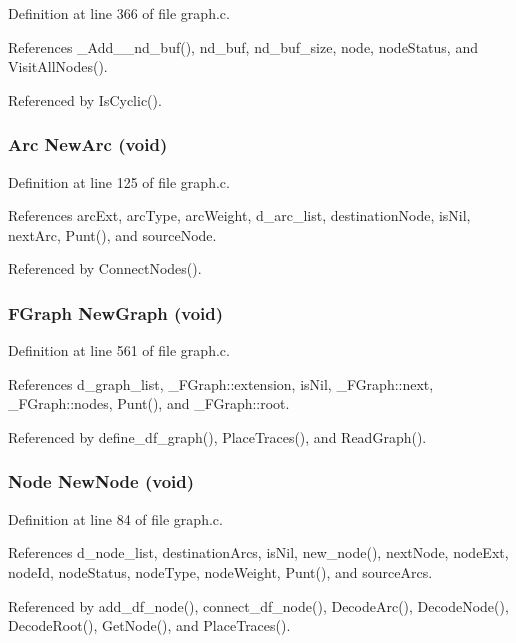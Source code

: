 Definition at line 366 of file graph.c.

References \_\-Add\_\_\-nd\_\-buf(), nd\_\-buf, nd\_\-buf\_\-size, node, node\-Status, and Visit\-All\-Nodes().

Referenced by Is\-Cyclic().
\subsubsection{\setlength{\rightskip}{0pt plus 5cm}\bf{Arc} New\-Arc (void)}\label{graph_8h_9ec8b541a689c1c76d2b64fde7489e2f}




Definition at line 125 of file graph.c.

References arc\-Ext, arc\-Type, arc\-Weight, d\_\-arc\_\-list, destination\-Node, is\-Nil, next\-Arc, Punt(), and source\-Node.

Referenced by Connect\-Nodes().
\subsubsection{\setlength{\rightskip}{0pt plus 5cm}\bf{FGraph} New\-Graph (void)}\label{graph_8h_1beb6b65e030388214bb0d0e35ea4d79}




Definition at line 561 of file graph.c.

References d\_\-graph\_\-list, \_\-FGraph::extension, is\-Nil, \_\-FGraph::next, \_\-FGraph::nodes, Punt(), and \_\-FGraph::root.

Referenced by define\_\-df\_\-graph(), Place\-Traces(), and Read\-Graph().
\subsubsection{\setlength{\rightskip}{0pt plus 5cm}\bf{Node} New\-Node (void)}\label{graph_8h_4317fcef2f2213d9d6e173c66b8c0f18}




Definition at line 84 of file graph.c.

References d\_\-node\_\-list, destination\-Arcs, is\-Nil, new\_\-node(), next\-Node, node\-Ext, node\-Id, node\-Status, node\-Type, node\-Weight, Punt(), and source\-Arcs.

Referenced by add\_\-df\_\-node(), connect\_\-df\_\-node(), Decode\-Arc(), Decode\-Node(), Decode\-Root(), Get\-Node(), and Place\-Traces().

